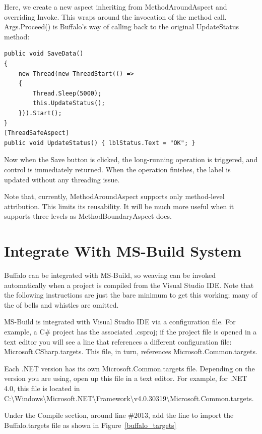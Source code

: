Here, we create a new aspect inheriting from MethodAroundAspect and overriding Invoke. This wraps around the invocation of the method call. Args.Proceed() is Buffalo’s way of calling back to the original UpdateStatus method:

\begin{lstlisting}[caption={Apply ThreadSafeAspect}, label=savedata5, frame=tb, basicstyle=\scriptsize]
public void SaveData()
{
	new Thread(new ThreadStart(() =>
	{
		Thread.Sleep(5000);
		this.UpdateStatus();
	})).Start();
}
[ThreadSafeAspect]
public void UpdateStatus() { lblStatus.Text = "OK"; }
\end{lstlisting}

Now when the Save button is clicked, the long-running operation is triggered, and control is immediately returned. When the operation finishes, the label is updated without any threading issue.

Note that, currently, MethodAroundAspect supports only method-level attribution. This limits its reusability. It will be much more useful when it supports three levels as MethodBoundaryAspect does.


\section{Integrate With MS-Build System}

Buffalo can be integrated with MS-Build, so weaving can be invoked automatically when a project is compiled from the Visual Studio IDE. Note that the following instructions are just the bare minimum to get this working; many of the of bells and whistles are omitted.

MS-Build is integrated with Visual Studio IDE via a configuration file. For example, a C\# project has the associated .csproj; if the project file is opened in a text editor you will see a line that references a different configuration file: Microsoft.CSharp.targets. This file, in turn, references Microsoft.Common.targets.

Each .NET version has its own Microsoft.Common.targets file. Depending on the version you are using, open up this file in a text editor. For example, for .NET 4.0, this file is located in C:\textbackslash Windows\textbackslash Microsoft.NET\textbackslash Framework\textbackslash v4.0.30319\textbackslash Microsoft.Common.targets.

Under the Compile section, around line \#2013, add the line to import the Buffalo.targets file as shown in Figure~\ref{buffalo_targets}

